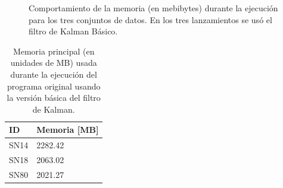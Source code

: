 \begin{figure}[h!]
\centering
{}\hfill
{}\vfill
{}
\caption{Comportamiento de la memoria (en mebibytes) durante la ejecuci\'on para los tres conjuntos de datos. En los tres lanzamientos se us\'o el filtro de Kalman B\'asico.}
\label{fig:mem_kbf}
\end{figure}

\begin{table}[h!]
\centering
\begin{tabular}{|l|l|}
\hline
\textbf{ID} & Memoria [MB]\\\hline\hline
SN14 & 2282.42\\\hline
SN18 & 2063.02\\\hline
SN80 & 2021.27\\\hline
\end{tabular}
\caption{Memoria principal (en unidades de MB) usada durante la ejecuci\'on del programa original usando la versi\'on b\'asica del filtro de Kalman.}
\label{tab:mem1}
\end{table}

